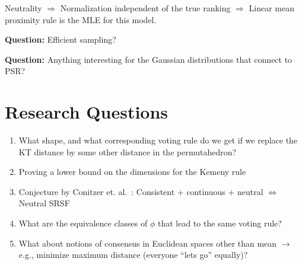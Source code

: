 \documentclass[10pt,letterpaper]{article}
\begin{document}
Neutrality $\Rightarrow$ Normalization independent of the true ranking $\Rightarrow$ Linear mean proximity rule is the MLE for this model. 

{\bf Question:} Efficient sampling?

{\bf Question:} Anything interesting for the Gaussian distributions that connect to PSR?

\section{Research Questions}
\begin{enumerate}
\item What shape, and what corresponding voting rule do we get if we replace the KT distance by some other distance in the permutahedron?
\item Proving a lower bound on the dimensions for the Kemeny rule
\item Conjecture by Conitzer et. al.~\cite{CRX09}: Consistent $+$ continuous $+$ neutral $\Leftrightarrow$ Neutral SRSF
\item What are the equivalence classes of $\phi$ that lead to the same voting rule?
\item What about notions of consensus in Euclidean spaces other than mean $\rightarrow$ e.g., minimize maximum distance (everyone ``lets go'' equally)?
\end{enumerate}


\begin{comment}
Mean proximity rule / generalized scoring rule / SRSF - Neutral $\Rightarrow$ SRSF iff MLE
{\bf Question:} (Linear) Mean Proximity Rules - Captures all ``pairwise comparison scoring rules''?
\end{comment}



\end{document}
